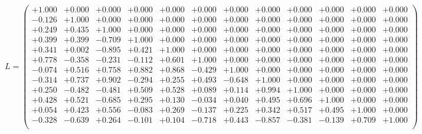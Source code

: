 \documentclass[9pt]{article}
\theoremstyle{plain}
\theoremstyle{definition}
\theoremstyle{remark}
\numberwithin{equation}{section}
\begin{document}
$L = \left(
\begin{array}{
cccccccccccc}
+1.000 & +0.000 & +0.000 & +0.000 & +0.000 & +0.000 & +0.000 & +0.000 & +0.000 & +0.000 & +0.000 & +0.000 \\
-0.126 & +1.000 & +0.000 & +0.000 & +0.000 & +0.000 & +0.000 & +0.000 & +0.000 & +0.000 & +0.000 & +0.000 \\
+0.249 & +0.435 & +1.000 & +0.000 & +0.000 & +0.000 & +0.000 & +0.000 & +0.000 & +0.000 & +0.000 & +0.000 \\
+0.399 & +0.399 & -0.709 & +1.000 & +0.000 & +0.000 & +0.000 & +0.000 & +0.000 & +0.000 & +0.000 & +0.000 \\
+0.341 & +0.002 & -0.895 & +0.421 & +1.000 & +0.000 & +0.000 & +0.000 & +0.000 & +0.000 & +0.000 & +0.000 \\
+0.778 & -0.358 & -0.231 & -0.112 & +0.601 & +1.000 & +0.000 & +0.000 & +0.000 & +0.000 & +0.000 & +0.000 \\
-0.074 & +0.516 & +0.758 & +0.882 & +0.868 & -0.429 & +1.000 & +0.000 & +0.000 & +0.000 & +0.000 & +0.000 \\
-0.314 & +0.737 & +0.902 & -0.294 & +0.255 & +0.493 & -0.648 & +1.000 & +0.000 & +0.000 & +0.000 & +0.000 \\
+0.250 & -0.482 & -0.481 & +0.509 & +0.528 & +0.089 & +0.114 & +0.994 & +1.000 & +0.000 & +0.000 & +0.000 \\
+0.428 & +0.521 & -0.685 & +0.295 & +0.130 & -0.034 & +0.040 & +0.495 & +0.696 & +1.000 & +0.000 & +0.000 \\
+0.054 & +0.423 & +0.556 & -0.083 & +0.269 & -0.137 & +0.225 & +0.342 & +0.517 & +0.495 & +1.000 & +0.000 \\
-0.328 & -0.639 & +0.264 & -0.101 & +0.104 & -0.718 & +0.443 & -0.857 & -0.381 & -0.139 & +0.709 & +1.000 \\
\end{array}
\right)$ \newline 
\end{document}
